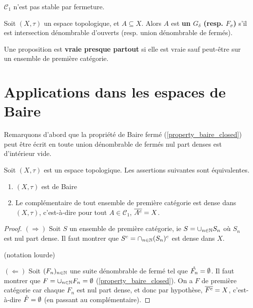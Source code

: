 \begin{remarque}
	$\mathcal{C}_{1}$ n'est pas stable par fermeture.
\end{remarque}

\begin{definition} 
	Soit $(X, \tau)$ un espace topologique, et $A \subseteq X$.
	Alors $A$ est \textbf{un $G_{\delta}$ (resp. $F_{\sigma}$)} s'il est intersection
	dénombrable d'ouverts (resp. union dénombrable de fermés).
\end{definition}

\begin{definition} 
	Une proposition est \textbf{vraie presque partout} si elle est vraie sauf
	peut-être sur un ensemble de première catégorie.
\end{definition}

\section{Applications dans les espaces de Baire}

Remarquons d'abord que la propriété de Baire fermé
(\ref{property_baire_closed}) peut être écrit en toute union dénombrable
de fermés nul part denses est d'intérieur vide.

\begin{proposition}
	\label{proposition_first_set_category_equiv_baire}
	Soit $(X, \tau)$ est un espace topologique. Les assertions suivantes sont
	équivalentes.
	\begin{enumerate}
		\item $(X, \tau)$ est de Baire
		\item Le complémentaire de tout ensemble de première catégorie est dense
			dans $(X, \tau)$, c'est-à-dire pour tout $A \in \mathcal{C}_{1}$, $\overline{A^{c}} = X$.
	\end{enumerate}
\end{proposition}

\ifdefined\outputproof
\begin{proof}
	$(\Rightarrow)$
	Soit $S$ un ensemble de première catégorie, ie $S = \cup_{n \in \mathbb{N}}
	S_{n}$ où $S_{n}$ est nul part dense. Il faut montrer que $S^{c} =
	\cap_{n \in \mathbb{N}} (S_{n})^{c}$ est dense dans $X$.

	(notation lourde)

	$(\Leftarrow)$
	Soit $(F_{n})_{n \in \mathbb{N}}$ une suite dénombrable de fermé tel que
	$\mathring{F_{n}} = \emptyset$.
	Il faut montrer que $F = \cup_{n \in \mathbb{N}} F_{n} = \emptyset$
	(\ref{property_baire_closed}).
	On a $F$ de première catégorie car chaque $F_{n}$ est nul part dense, et
	donc par hypothèse, $\overline{F^{c}} = X$, c'est-à-dire $\mathring{F} =
	\emptyset$ (en passant au complémentaire).
\end{proof}
\fi

